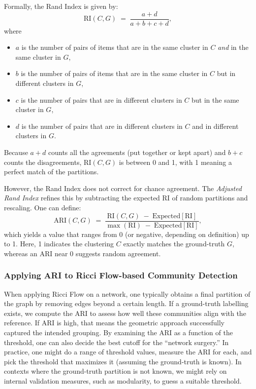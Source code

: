 Formally, the Rand Index is given by:
\begin{equation}
\mathrm{RI}(C,G) \;=\; \frac{a + d}{a + b + c + d},
\end{equation}
where 
\begin{itemize}
    \item $a$ is the number of pairs of items that are in the same cluster in $C$ \emph{and} in the same cluster in $G$,
    \item $b$ is the number of pairs of items that are in the same cluster in $C$ but in different clusters in $G$,
    \item $c$ is the number of pairs that are in different clusters in $C$ but in the same cluster in $G$,
    \item $d$ is the number of pairs that are in different clusters in $C$ and in different clusters in $G$.
\end{itemize}
Because $a+d$ counts all the agreements (put together or kept apart) and $b+c$ counts the disagreements, $\mathrm{RI}(C,G)$ is between 0 and 1, with 1 meaning a perfect match of the partitions.

However, the Rand Index does not correct for chance agreement. The \emph{Adjusted Rand Index} refines this by subtracting the expected RI of random partitions and rescaling. One can define:
\begin{equation}
\mathrm{ARI}(C,G) \;=\; \frac{\mathrm{RI}(C,G)\;-\;\mathrm{Expected}[\mathrm{RI}]}{\max(\mathrm{RI})\;-\;\mathrm{Expected}[\mathrm{RI}]},
\end{equation}
which yields a value that ranges from 0 (or negative, depending on definition) up to 1. Here, 1 indicates the clustering $C$ exactly matches the ground-truth $G$, whereas an ARI near 0 suggests random agreement.

\subsubsection{Applying ARI to Ricci Flow-based Community Detection}
When applying Ricci Flow on a network, one typically obtains a final partition of the graph by removing edges beyond a certain length. If a ground-truth labelling exists, we compute the ARI to assess how well these communities align with the reference. If $\mathrm{ARI}$ is high, that means the geometric approach successfully captured the intended grouping. By examining the ARI as a function of the threshold, one can also decide the best cutoff for the “network surgery.” In practice, one might do a range of threshold values, measure the ARI for each, and pick the threshold that maximizes it (assuming the ground-truth is known). In contexts where the ground-truth partition is not known, we might rely on internal validation measures, such as modularity, to guess a suitable threshold.

